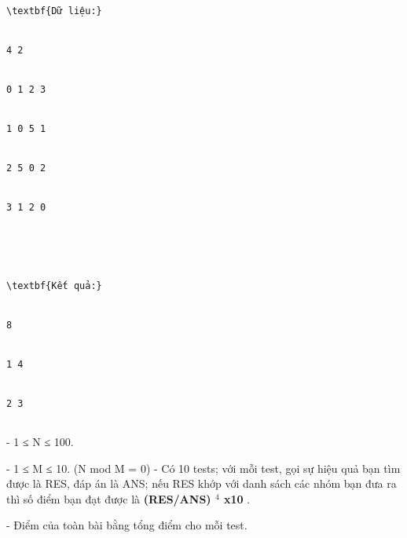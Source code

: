 \begin{verbatim}
\textbf{Dữ liệu:}


4 2


0 1 2 3


1 0 5 1


2 5 0 2


3 1 2 0





\textbf{Kết quả:}


8


1 4


2 3


\end{verbatim}
- 1 ≤ N ≤ 100.   


   - 1 ≤ M ≤ 10. (N mod M = 0)
- Có 10 tests; với mỗi test, gọi sự hiệu quả bạn tìm được là RES, đáp án là ANS; nếu RES khớp với danh sách các nhóm bạn đưa ra thì số điểm bạn đạt được là   \textbf{    (RES/ANS)    $^     4    $    x10   }   .   


   - Điểm của toàn bài bằng tổng điểm cho mỗi test.